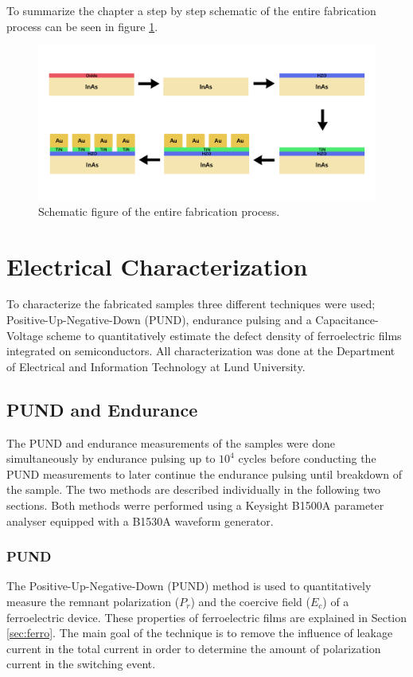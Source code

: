\documentclass[11pt,twoside]{eitExjobb}
\begin{document}
To summarize the chapter a step by step schematic of the entire fabrication
process can be seen in figure \ref{fig:fab_done}.

\begin{figure}[htbp]
    \centering
    \includegraphics[width=.80\linewidth]{fig/fabproc/fab_done.png}
    \caption{Schematic figure of the entire fabrication process.}\label{fig:fab_done}
\end{figure}

\chapter{Electrical Characterization}\label{ch:char}

To characterize the fabricated samples three different techniques were used;
Positive-Up-Negative-Down (PUND), endurance pulsing and a Capacitance-Voltage scheme to
quantitatively estimate the defect density of ferroelectric films integrated on
semiconductors. \cite{persson2020method} All characterization was done at the
Department of Electrical and Information Technology at Lund University.

\section{PUND and Endurance}\label{sec:PandE}
The PUND and endurance measurements of the samples were done simultaneously by
endurance pulsing up to $10^4$ cycles before conducting the PUND measurements to
later continue the endurance pulsing until breakdown of the sample. The two
methods are described individually in the following two sections. Both methods
werre performed using a Keysight B1500A parameter analyser equipped with a
B1530A waveform generator.

\subsection{PUND}\label{sec:PUND}
The Positive-Up-Negative-Down (PUND) method is used to quantitatively measure
the remnant polarization ($P_r$) and the coercive field ($E_c$) of a
ferroelectric device. These properties of ferroelectric films are explained in
Section \ref{sec:ferro}. The main goal of the technique is to remove the
influence of leakage current in the total current in order to determine the
amount of polarization current in the switching event.
\end{document}

